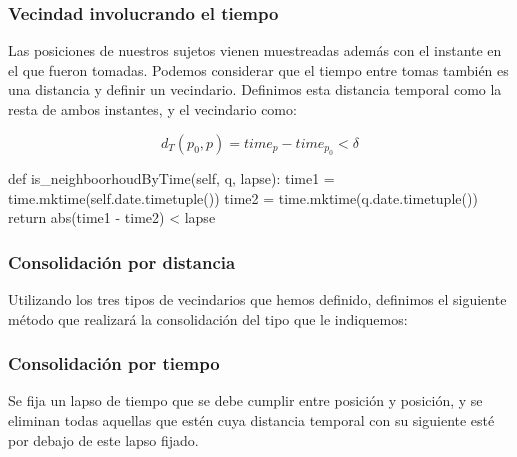 \documentclass[10pt, spanish]{beamer}
\begin{document}
\begin{frame}[fragile]
\frametitle{Vecindad involucrando el tiempo}
Las posiciones de nuestros sujetos vienen muestreadas adem\'as con el instante en el que fueron tomadas. Podemos considerar que el tiempo entre tomas tambi\'en es una distancia y definir un vecindario. Definimos esta distancia temporal como la resta de ambos instantes, y el vecindario como: 

$$ d_T(p_0, p) = time_p - time_{p_0} < \delta $$

\bigskip

\begin{python}
	def is_neighboorhoudByTime(self, q, lapse):
		time1 = time.mktime(self.date.timetuple())
		time2 = time.mktime(q.date.timetuple())
		return abs(time1 - time2) < lapse
\end{python}

\end{frame}

\begin{frame}[fragile]
\frametitle{Consolidaci\'on por distancia}
Utilizando los tres tipos de vecindarios que hemos definido, definimos el
siguiente método que realizará la consolidación del tipo que le indiquemos:\\

\bigskip

\begin{algorithmic}[1]
        \Else
        \EndIf
\EndFor
\EndFunction
\end{algorithmic}
\end{frame}

\begin{frame}[fragile]
\frametitle{Consolidaci\'on por tiempo}

Se fija un lapso de tiempo que se debe cumplir entre posici\'on y posici\'on, y se eliminan todas aquellas que est\'en cuya distancia temporal con su siguiente est\'e por debajo de este lapso fijado.\\

\bigskip
\begin{algorithmic}[1]
		\EndIf
	\EndFor
\EndFunction
\end{algorithmic}
\end{frame}
\end{document}
